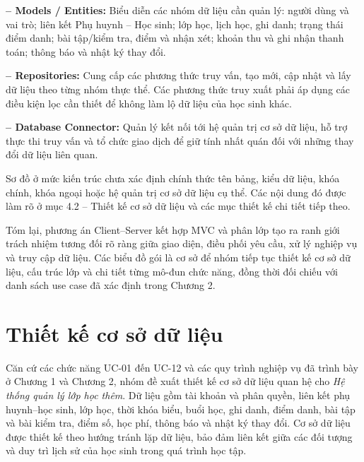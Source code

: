 \begin{samepage}
\noindent\hspace*{0.65em}\textbf{– Models / Entities: }Biểu diễn các nhóm dữ liệu cần quản lý: người dùng và vai trò; liên kết Phụ huynh – Học sinh; lớp học, lịch học, ghi danh; trạng thái điểm danh; bài tập/kiểm tra, điểm và nhận xét; khoản thu và ghi nhận thanh toán; thông báo và nhật ký thay đổi.\par
\end{samepage}

\begin{samepage}
\noindent\hspace*{0.65em}\textbf{– Repositories: }Cung cấp các phương thức truy vấn, tạo mới, cập nhật và lấy dữ liệu theo từng nhóm thực thể. Các phương thức truy xuất phải áp dụng các điều kiện lọc cần thiết để không làm lộ dữ liệu của học sinh khác.\par
\end{samepage}

\begin{samepage}
\noindent\hspace*{0.65em}\textbf{– Database Connector: }Quản lý kết nối tới hệ quản trị cơ sở dữ liệu, hỗ trợ thực thi truy vấn và tổ chức giao dịch để giữ tính nhất quán đối với những thay đổi dữ liệu liên quan.\par
\end{samepage}

Sơ đồ ở mức kiến trúc chưa xác định chính thức tên bảng, kiểu dữ liệu, khóa chính, khóa ngoại hoặc hệ quản trị cơ sở dữ liệu cụ thể. Các nội dung đó được làm rõ ở mục 4.2 – Thiết kế cơ sở dữ liệu và các mục thiết kế chi tiết tiếp theo.\par

Tóm lại, phương án Client–Server kết hợp MVC và phân lớp tạo ra ranh giới trách nhiệm tương đối rõ ràng giữa giao diện, điều phối yêu cầu, xử lý nghiệp vụ và truy cập dữ liệu. Các biểu đồ gói là cơ sở để nhóm tiếp tục thiết kế cơ sở dữ liệu, cấu trúc lớp và chi tiết từng mô-đun chức năng, đồng thời đối chiếu với danh sách use case đã xác định trong Chương 2.\par

\section{Thiết kế cơ sở dữ liệu}

Căn cứ các chức năng UC-01 đến UC-12 và các quy trình nghiệp vụ đã trình bày ở Chương 1 và Chương 2, nhóm đề xuất thiết kế cơ sở dữ liệu quan hệ cho \textit{Hệ thống quản lý lớp học thêm}. Dữ liệu gồm tài khoản và phân quyền, liên kết phụ huynh--học sinh, lớp học, thời khóa biểu, buổi học, ghi danh, điểm danh, bài tập và bài kiểm tra, điểm số, học phí, thông báo và nhật ký thay đổi. Cơ sở dữ liệu được thiết kế theo hướng tránh lặp dữ liệu, bảo đảm liên kết giữa các đối tượng và duy trì lịch sử của học sinh trong quá trình học tập.

